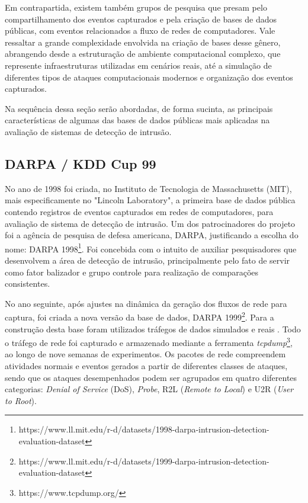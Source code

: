 Em contrapartida, existem também grupos de pesquisa que presam pelo compartilhamento dos eventos capturados e pela criação de bases de dados públicas, com eventos relacionados a fluxo de redes de computadores. Vale ressaltar a grande complexidade envolvida na criação de bases desse gênero, abrangendo desde a estruturação de ambiente computacional complexo, que represente infraestruturas utilizadas em cenários reais, até a simulação de diferentes tipos de ataques computacionais modernos e organização dos eventos capturados.

Na sequência dessa seção serão abordadas, de forma sucinta, as principais características de algumas das bases de dados públicas mais aplicadas na avaliação de sistemas de detecção de intrusão.

\subsection{DARPA / KDD Cup 99}
\label{Subsec:kdd99}

No ano de 1998 foi criada, no Instituto de Tecnologia de Massachusetts (MIT), mais especificamente no "Lincoln Laboratory", a primeira base de dados pública contendo registros de eventos capturados em redes de computadores, para avaliação de sistema de detecção de intrusão. Um dos patrocinadores do projeto foi a agência de pesquisa de defesa americana, DARPA, justificando a escolha do nome: DARPA 1998\footnote{https://www.ll.mit.edu/r-d/datasets/1998-darpa-intrusion-detection-evaluation-dataset}. Foi concebida com o intuito de auxiliar pesquisadores que desenvolvem a área de detecção de intrusão, principalmente pelo fato de servir como fator balizador e grupo controle para realização de comparações consistentes.

No ano seguinte, após ajustes na dinâmica da geração dos fluxos de rede para captura, foi criada a nova versão da base de dados, DARPA 1999\footnote{https://www.ll.mit.edu/r-d/datasets/1999-darpa-intrusion-detection-evaluation-dataset}. Para a construção desta base foram utilizados tráfegos de dados simulados e reais \cite{thomas2008}. Todo o tráfego de rede foi capturado e armazenado mediante a ferramenta \textit{tcpdump}\footnote{https://www.tcpdump.org/}, ao longo de nove semanas de experimentos. Os pacotes de rede compreendem atividades normais e eventos gerados a partir de diferentes classes de ataques, sendo que os ataques desempenhados podem ser agrupados em quatro diferentes categorias: \textit{Denial of Service} (DoS), \textit{Probe}, R2L (\textit{Remote to Local}) e U2R (\textit{User to Root}).


